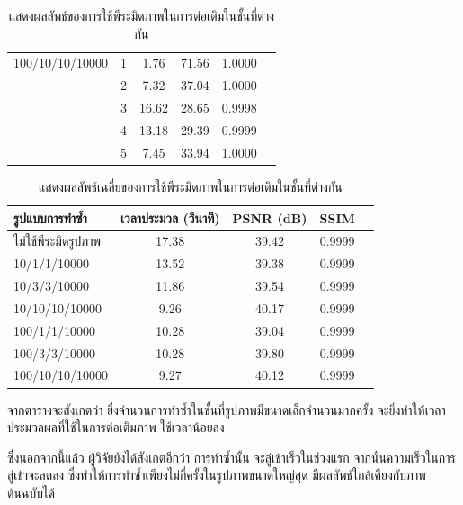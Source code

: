 \documentclass[hidelinks, a4paper,12pt]{article}
\numberwithin{equation}{section}							%
\numberwithin{equation}{section}
\begin{document}
{\begin{table}[H]
\begin{tabular}[ht]{|l|c|c|c|c|c|}
			\hline
			100/10/10/10000  & 1 & 1.76 & 71.56 & 1.0000 \\
			& 2 & 7.32 & 37.04 & 1.0000\\
			& 3 & 16.62 & 28.65 & 0.9998 \\
			& 4 & 13.18 & 29.39 & 0.9999\\
			& 5 & 7.45 & 33.94 & 1.0000 \\
			\hline
		\end{tabular}
		\caption{แสดงผลลัพธ์ของการใช้พีระมิดภาพในการต่อเติมในชั้นที่ต่างกัน}
\end{table}	
	\begin{table}[H]
		\centering
		\begin{tabular}[ht]{|l|c|c|c|c|}
			\hline
			รูปแบบการทำซ้ำ  & เวลาประมวล  (วินาที) & PSNR (dB) & SSIM \\
			\hline
			ไม่ใช้พีระมิดรูปภาพ & 17.38 & 39.42 & 0.9999 \\
			10/1/1/10000 & 13.52 & 39.38 & 0.9999 \\
			10/3/3/10000 & 11.86 & 39.54 & 0.9999 \\
			10/10/10/10000 & 9.26 & 40.17 & 0.9999\\
			100/1/1/10000 & 10.28 & 39.04 & 0.9999\\
			100/3/3/10000 & 10.28 & 39.80 & 0.9999\\
			100/10/10/10000 & 9.27 & 40.12 & 0.9999 \\
			\hline
		\end{tabular}
		\caption{แสดงผลลัพธ์เฉลี่ยของการใช้พีระมิดภาพในการต่อเติมในชั้นที่ต่างกัน}
	\end{table}	
	
	\hspace{1cm}จากตารางจะสังเกตว่า ยิ่งจำนวนการทำซ้ำในชั้นที่รูปภาพมีขนาดเล็กจำนวนมากครั้ง จะยิ่งทำให้เวลาประมวลผลที่ใช้ในการต่อเติมภาพ ใช้เวลาน้อยลง
	
	\hspace{1cm} ซึ่งนอกจากนี้แล้ว ผู้วิจัยยังได้สังเกตอีกว่า การทำซ้ำนั้น จะลู่เข้าเร็วในช่วงแรก จากนั้นความเร็วในการลู่เข้าจะลดลง ซึ่งทำให้การทำซ้ำเพียงไม่กี่ครั้งในรูปภาพขนาดใหญ่สุด มีผลลัพธ์ใกล้เคียงกับภาพต้นฉบับได้
	
}
\end{document}
